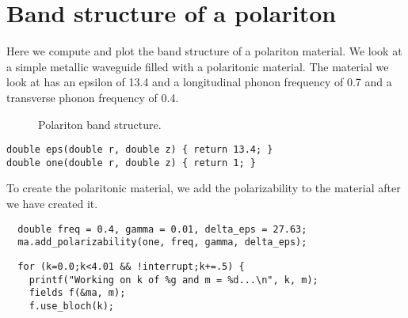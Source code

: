 \section{Band structure of a polariton}

\begin{comment}
#include <stdio.h>
#include <stdlib.h>

#include "dactyl.h"

const double rmax = 1.0;
\end{comment}

Here we compute and plot the band structure of a polariton material.  We
look at a simple metallic waveguide filled with a polaritonic material.
The material we look at has an epsilon of 13.4 and a longitudinal phonon
frequency of 0.7 and a transverse phonon frequency of 0.4.

\begin{figure}
\label{polaritonbands}
\caption{Polariton band structure.}
\end{figure}

\begin{verbatim}
double eps(double r, double z) { return 13.4; }
double one(double r, double z) { return 1; }
\end{verbatim}

\begin{comment}
int main(int argc, char **argv) {
  deal_with_ctrl_c();
  const int a = 10;
  const int m = 0;
  double k;
  const int ttot = 1000*a;  
\end{comment}

\begin{comment}
  mat ma(eps, rmax, 0.0, a);
  const char *dirname = make_output_directory(argv[0]);
  printf("Storing output in directory %
  //FILE *ban = create_output_file(dirname, "bands");
  ma.set_output_directory(dirname);
  grace g("bands", dirname);
  g.set_range(0.0, 4.0, 0.0, 1.1);
\end{comment}

To create the polaritonic material, we add the polarizability to the
material after we have created it.

\begin{verbatim}
  double freq = 0.4, gamma = 0.01, delta_eps = 27.63;
  ma.add_polarizability(one, freq, gamma, delta_eps);
\end{verbatim}

\begin{verbatim}
  for (k=0.0;k<4.01 && !interrupt;k+=.5) {
    printf("Working on k of %g and m = %d...\n", k, m);
    fields f(&ma, m);
    f.use_bloch(k);
\end{verbatim}

